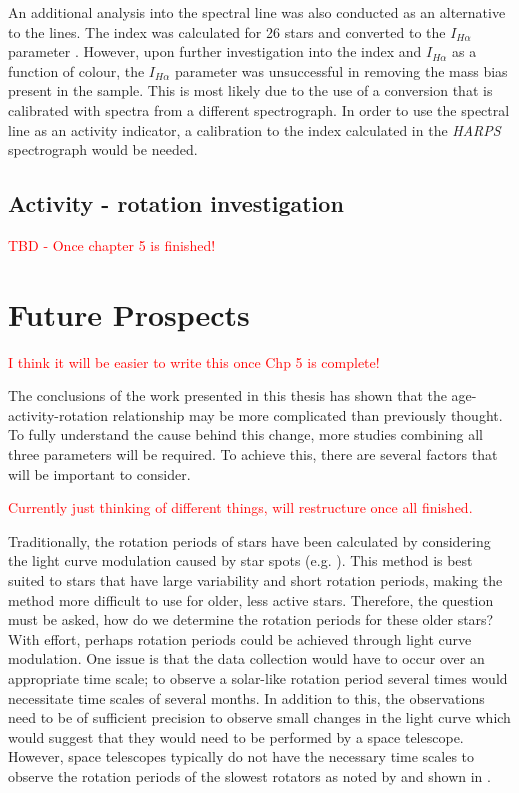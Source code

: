 An additional analysis into the \Halpha spectral line was also conducted as an alternative to the \caII lines. The \Halpha index was calculated for 26 stars and converted to the $I_{H\alpha}$ parameter \citep{Gomes_da_Silva_etal_2014}. However, upon further investigation into the \Halpha index and $I_{H\alpha}$ as a function of colour, the $I_{H\alpha}$ parameter was unsuccessful in removing the mass bias present in the sample. This is most likely due to the use of a conversion that is calibrated with spectra from a different spectrograph. In order to use the \Halpha spectral line as an activity indicator, a calibration to the \Halpha index calculated in the \textit{HARPS} spectrograph would be needed.

\subsection{Activity - rotation investigation}

\textcolor{red}{TBD - Once chapter 5 is finished!}

\section{Future Prospects}

\textcolor{red}{I think it will be easier to write this once Chp 5 is complete!}

The conclusions of the work presented in this thesis has shown that the age-activity-rotation relationship may be more complicated than previously thought. To fully understand the cause behind this change, more studies combining all three parameters will be required. To achieve this, there are several factors that will be important to consider.

\textcolor{red}{Currently just thinking of different things, will restructure once all finished.}

Traditionally, the rotation periods of stars have been calculated by considering the light curve modulation caused by star spots (e.g. \citealt{McQuillan_etal_2014}). This method is best suited to stars that have large variability and short rotation periods, making the method more difficult to use for older, less active stars. Therefore, the question must be asked, how do we determine the rotation periods for these older stars? With effort, perhaps rotation periods could be achieved through light curve modulation. One issue is that the data collection would have to occur over an appropriate time scale; to observe a solar-like rotation period several times would necessitate time scales of several months. In addition to this, the observations need to be of sufficient precision to observe small changes in the light curve which would suggest that they would need to be performed by a space telescope. However, space telescopes typically do not have the necessary time scales to observe the rotation periods of the slowest rotators as noted by \citet{Barnes_etal_2016} and shown in \citet{Esselstein_etal_2018}.

